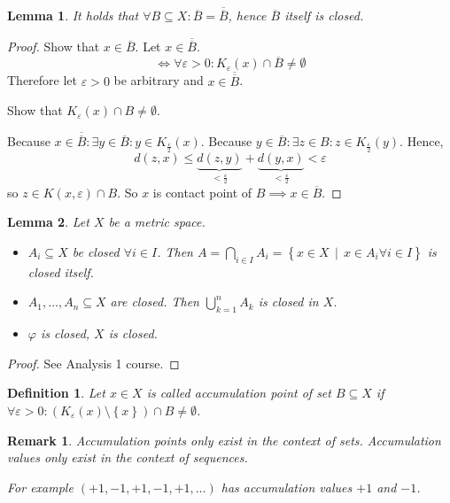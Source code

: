 \documentclass{article}
\newtheorem{definition}{Definition}  \numberwithin{definition}{section}
\newtheorem{lemma}{Lemma}  \numberwithin{lemma}{section}
\newtheorem{remark}{Remark}  \numberwithin{remark}{section}
\newcommand{\set}[1]{\left\{#1\right\}}
\newcommand{\setdef}[2]{\left\{\left.#1\,\middle|\,#2\right.\right\}}
\begin{document}
\begin{lemma}
  It holds that $\forall B \subseteq X: \overline{B} = \overline{\overline{B}}$,
  hence $\overline{B}$ itself is closed.
\end{lemma}
\begin{proof}
  Show that $x \in \overline{B}$. Let $x \in \overline{\overline{B}}$.
  \[ \iff \forall \varepsilon > 0: K_{\varepsilon}(x) \cap \overline{B} \neq \emptyset \]
  Therefore let $\varepsilon > 0$ be arbitrary and $x \in \overline{\overline{B}}$.

  Show that $K_{\varepsilon}(x) \cap B \neq \emptyset$.

  Because $x \in \overline{\overline{B}}: \exists y \in \overline{B}: y \in K_{\frac\varepsilon2}(x)$.
  Because $y \in \overline{B}: \exists z \in B: z \in K_{\frac\varepsilon2}(y)$. Hence,
  \[ d(z,x) \leq \underbrace{d(z,y)}_{<\frac\varepsilon2} + \underbrace{d(y,x)}_{<\frac\varepsilon2} < \varepsilon \]
  so $z \in K(x,\varepsilon) \cap B$. So $x$ is contact point of $B \implies x \in \overline{B}$.
\end{proof}

\begin{lemma}
  \label{lemma4}
  Let $X$ be a metric space.
  \begin{itemize}
    \item
      $A_i \subseteq X$ be closed $\forall i \in I$.
      Then $A = \bigcap_{i \in I} A_i = \setdef{x \in X}{x \in A_i \forall i \in I}$
      is closed itself.
    \item
      $A_1, \dots, A_n \subseteq X$ are closed. Then $\bigcup_{k=1}^n A_k$ is closed in $X$.
    \item
      $\varphi$ is closed, $X$ is closed.
  \end{itemize}
\end{lemma}

\begin{proof}
  See Analysis 1 course.
\end{proof}

\begin{definition} %
  Let $x \in X$ is called accumulation point of set $B \subseteq X$ if $\forall \varepsilon > 0: (K_{\varepsilon}(x) \setminus \set{x}) \cap B \neq \emptyset$.
\end{definition}

\begin{remark}
  Accumulation \emph{points} only exist in the context of \emph{sets}.
  Accumulation \emph{values} only exist in the context of \emph{sequences}.

  For example $(+1, -1, +1, -1, +1, \dots)$ has accumulation \emph{values} $+1$ and $-1$.
\end{remark}
\end{document}
